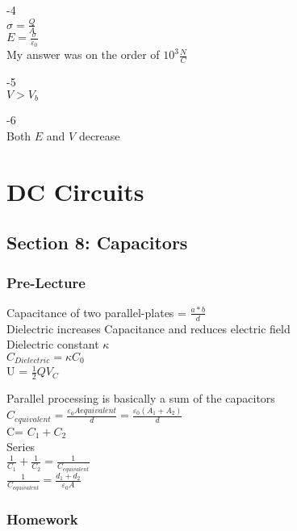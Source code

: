 \documentclass{article}
\begin{document}
\vspace{2mm}

-4 \\
$\sigma = \frac{Q}{A}$ \\
$E= \frac{\sigma}{\varepsilon_0}$ \\
My answer was on the order of $10^{3}\frac{N}{C}$
\vspace{2mm}

-5 \\
$V>V_b$

\vspace{2mm}

-6 \\
Both $E$ and $V$ decrease

\vspace{2mm}

\section{DC Circuits}

\subsection{Section 8: Capacitors}
\subsubsection{Pre-Lecture}
\noindent
Capacitance of two parallel-plates = $\frac{a*b}{d}$ \\
Dielectric increases Capacitance and reduces electric field \\
Dielectric constant $\kappa$ \\
$C_{Dielectric} = \kappa C_0$ \\
U = $\frac{1}{2}QV_C$

\vspace{2mm}

\noindent
Parallel processing is basically a sum of the capacitors \\
$C_{equivalent} = \frac{\varepsilon_0 A{equivalent}}{d} = \frac{\varepsilon_0 (A_1 + A_2)}{d} $ \\
C= $C_1 + C_2$ \\
Series \\
$\frac{1}{C_1} + \frac{1}{C_2} = \frac{1}{C_{equivalent}}$ \\
$\frac{1}{C_{equivalent}} = \frac{d_1 + d_2}{\varepsilon_0A}$


\subsubsection{Homework}
\end{document}
